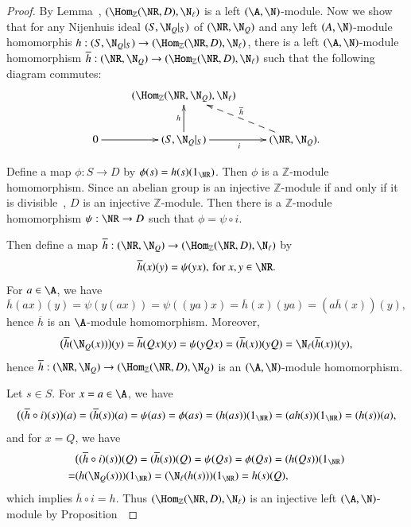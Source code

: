 \documentclass[12pt]{amsart}
\theoremstyle{definition}
\begin{document}
\begin{proof}
By Lemma~, $(\Hom_{\mathbb{Z}}(\NR,D),\N_{\ell})$ is a left $(\A,\N)$-module. Now we show that for any Nijenhuis ideal $(S, \N_Q|_S)$ of $(\NR, \N_Q)$ and any left $(A,\N)$-module homomorphis $h:(S, \N_Q|_S) \rightarrow (\Hom_{\mathbb{Z}}(\NR,D),\N_{\ell})$, there is a left $(\A,\N)$-module homomorphism $\overline{h}: (\NR, \N_Q) \rightarrow (\Hom_{\mathbb{Z}}(\NR,D),\N_{\ell})$ such that the following diagram commutes: 
$$
\xymatrix{
&(\Hom_{\mathbb{Z}}(\NR,\N_Q), \N_{\ell})\ar@{<--}^{\overline{h}}[dr]&\\
0\ar[r]&(S, \N_Q|_{S})\ar_{i}[r]\ar^{h}[u]&(\NR, \N_Q).}
$$

Define a map $\phi: S\rightarrow D$ by $\phi(s)=h(s)(1_{\NR})$. Then $\phi$ is a $\mathbb{Z}$-module homomorphism.  Since an abelian group is an injective $\mathbb{Z}$-module if and only if it is divisible~, $D$ is an injective $\mathbb{Z}$-module. Then there is a $\mathbb{Z}$-module homomorphism $\psi: \NR \rightarrow D$ such that $\phi=\psi \circ i$.

Then define a map $\overline{h}: (\NR, \N_Q) \rightarrow (\Hom_{\mathbb{Z}}(\NR,D),\N_{\ell})$ by
\[
\overline{h}(x)(y)= \psi(yx), \, \text{for $x, y \in \NR$.}
\]
For $a \in \A$, we have 
\[
\overline{h}(ax)(y)=\psi(y(ax))=\psi((ya)x)=\overline{h}(x)(ya)=(a \overline{h}(x))(y),
\]
hence $\overline{h}$ is an $\A$-module homomorphism. Moreover,
\[
\big( \overline{h} (\N_Q(x)) \big)(y)=\overline{h}(Qx)(y)=\psi(yQx)=(\overline{h}(x))(yQ)=\N_{\ell}(\overline{h}(x))(y),
\]
hence $\overline{h}: (\NR, \N_Q) \rightarrow (\Hom_{\mathbb{Z}}(\NR,D),\N_Q)$ is an $(\A,\N)$-module homomorphism.

Let $s \in S$. For $x=a \in \A$, we have
\begin{align*}
\big( (\overline{h} \circ i)(s) \big)(a)=(\overline{h}(s))(a)=\psi(as)=\phi(as)=(h(as))(1_{\NR})=(ah(s))(1_{\NR})=(h(s))(a),
\end{align*}
and for $x=Q$, we have 
\begin{align*}
& \big((\overline{h} \circ i) (s)\big) (Q)=(\overline{h}(s))(Q)=\psi(Qs)=\phi(Qs)=(h(Qs))(1_{\NR})\\
=& (h(\N_Q(s)))(1_{\NR})=(\N_{\ell}(h(s)))(1_{\NR})=h(s)(Q),
\end{align*}
which implies $\overline{h} \circ i=h$. Thus $(\Hom_{\mathbb{Z}}(\NR,D),\N_{\ell})$ is an injective left $(\A,\N)$-module by Proposition~
\end{proof}
\end{document}
